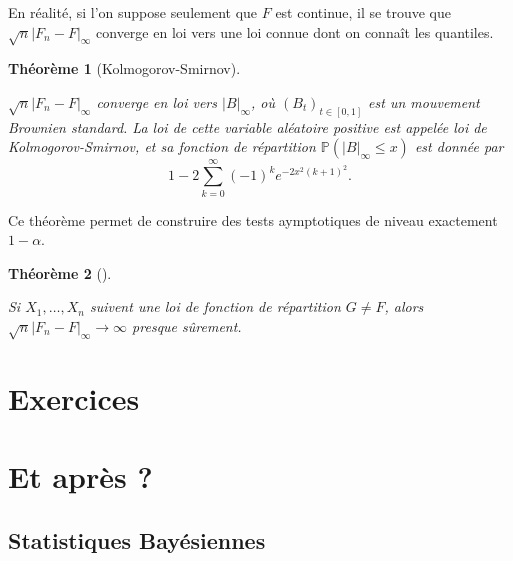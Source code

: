 \documentclass[
  10,
  letterpaper,
  DIV=11,
  numbers=noendperiod]{scrreport}
\theoremstyle{plain}
\newtheorem{theorem}{Théorème}[chapter]
\theoremstyle{definition}
\theoremstyle{plain}
\theoremstyle{definition}
\theoremstyle{definition}
\theoremstyle{plain}
\theoremstyle{remark}
\begin{document}
En réalité, si l'on suppose seulement que \(F\) est continue, il se
trouve que \(\sqrt{n}|F_n - F|_\infty\) converge en loi vers une loi
connue dont on connaît les quantiles.

\begin{theorem}[Kolmogorov-Smirnov]\protect\hypertarget{thm-kolmo-smirnov}{}\label{thm-kolmo-smirnov}

\(\sqrt{n}|F_n - F|_\infty\) converge en loi vers \(|B|_\infty\), où
\((B_t)_{t\in [0,1]}\) est un mouvement Brownien standard. La loi de
cette variable aléatoire positive est appelée \emph{loi de
Kolmogorov-Smirnov}, et sa fonction de répartition
\(\mathbb{P}(|B|_\infty \leqslant x)\) est donnée par
\[1 - 2\sum_{k=0}^\infty (-1)^k e^{-2x^2 (k+1)^2}.\]

\end{theorem}

Ce théorème permet de construire des tests aymptotiques de niveau
exactement \(1-\alpha\).

\begin{theorem}[]\protect\hypertarget{thm-consistance-ks}{}\label{thm-consistance-ks}

Si \(X_1, \dotsc, X_n\) suivent une loi de fonction de répartition
\(G \neq F\), alors \(\sqrt{n}|F_n - F|_\infty \to \infty\) presque
sûrement.

\end{theorem}


\hypertarget{exercices-10}{%
\chapter*{Exercices}\label{exercices-10}}



\hypertarget{et-apruxe8s}{%
\chapter*{Et après ?}\label{et-apruxe8s}}


\hypertarget{statistiques-bayuxe9siennes}{%
\section*{Statistiques Bayésiennes}\label{statistiques-bayuxe9siennes}}
\end{document}
